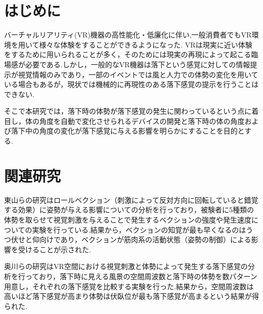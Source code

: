 \documentclass[uplatex]{jsarticle}
\begin{document}
\vspace{3mm}

\setcounter{page}{9}

\section{はじめに}
バーチャルリアリティ(VR)機器の高性能化・低廉化に伴い,一般消費者でもVR環境を用いて様々な体験をすることができるようになった.
VRは現実に近い体験をするために用いられることが多く，そのためには現実の再現によって起こる臨場感が必要である.しかし，一般的なVR機器は落下という感覚に対しての情報提示が視覚情報のみであり，一部のイベントでは風と人力での体勢の変化を用いている場合もあるが，現状では機械的に再現性のある落下感覚の提示を行うことはできない.

そこで本研究では，落下時の体勢が落下感覚の発生に関わっているという点に着目し，体の角度を自動で変化させられるデバイスの開発と落下時の体の角度および落下中の角度の変化が落下感覚に与える影響を明らかにすることを目的とする.



\section{関連研究}
東山らの研究\cite{vection}はロールベクション（刺激によって反対方向に回転していると錯覚する効果）に姿勢が与える影響についての分析を行っており，被験者に5種類の体勢を取らせて視覚刺激を与えることで発生するベクションの強度や発生速度についての実験を行っている.結果から，ベクションの知覚が最も早くなるのはうつ伏せと仰向けであり，ベクションが筋肉系の活動状態（姿勢の制御）による影響を受けることが示された.

奥川らの研究\cite{spatial_stimulation_effect_falling}はVR空間における視覚刺激と体勢によって発生する落下感覚の分析を行っており，落下時に見える風景の空間周波数と落下時の体勢を数パターン用意し，それぞれの落下感覚を比較する実験を行った.結果から，空間周波数は高いほど落下感覚が高まり体勢は伏臥位が最も落下感覚が高まるという結果が得られた.
\end{document}
